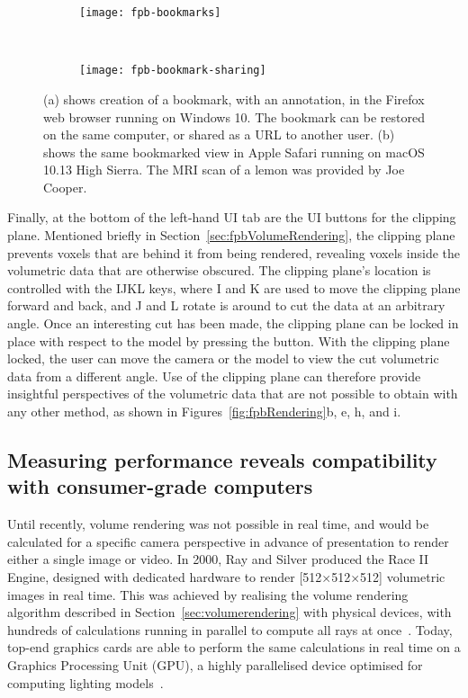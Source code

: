 \begin{figure}[htbp!]
\centering
\centering
\begin{subfigure}[b]{1.0\textwidth}
\texttt{[image: fpb-bookmarks]}
\caption{} \label{fig:fpbBookmarkCreation}
\end{subfigure}

~\newline
\begin{subfigure}[b]{1.0\textwidth}
\texttt{[image: fpb-bookmark-sharing]}
\caption{} \label{fig:fpbBookmarkRecieved}
\end{subfigure}
\caption[FPBioimage: Bookmarks can be shared as a URL for another user to open]{(a) shows creation of a bookmark, with an annotation, in the Firefox web browser running on Windows 10. The bookmark can be restored on the same computer, or shared as a URL to another user. (b) shows the same bookmarked view in Apple Safari running on macOS 10.13 High Sierra. The MRI scan of a lemon was provided by Joe Cooper. }
\label{fig:fpbBookmarks}
\end{figure}

Finally, at the bottom of the left-hand UI tab are the UI buttons for the clipping plane.
Mentioned briefly in Section~\ref{sec:fpbVolumeRendering}, the clipping plane prevents voxels that are behind it from being rendered, revealing voxels inside the volumetric data that are otherwise obscured.
The clipping plane's location is controlled with the IJKL keys, where I and K are used to move the clipping plane forward and back, and J and L rotate is around to cut the data at an arbitrary angle.
Once an interesting cut has been made, the clipping plane can be locked in place with respect to the model by pressing the  button.
With the clipping plane locked, the user can move the camera or the model to view the cut volumetric data from a different angle.
Use of the clipping plane can therefore provide insightful perspectives of the volumetric data that are not possible to obtain with any other method, as shown in Figures~\ref{fig:fpbRendering}b, e, h, and i.

\subsection{Measuring performance reveals compatibility with consumer-grade computers} \label{sec:fpbPerformance}
Until recently, volume rendering was not possible in real time, and would be calculated for a specific camera perspective in advance of presentation to render either a single image or video.
In 2000, Ray and Silver produced the Race II Engine, designed with dedicated hardware to render [512$\times$512$\times$512] volumetric images in real time.
This was achieved by realising the volume rendering algorithm described in Section~\ref{sec:volumerendering} with physical devices, with hundreds of calculations running in parallel to compute all rays at once~\cite{ray2000race}.
Today, top-end graphics cards are able to perform the same calculations in real time on a Graphics Processing Unit (GPU), a highly parallelised device optimised for computing lighting models~\cite{lindholm2008nvidia}.

